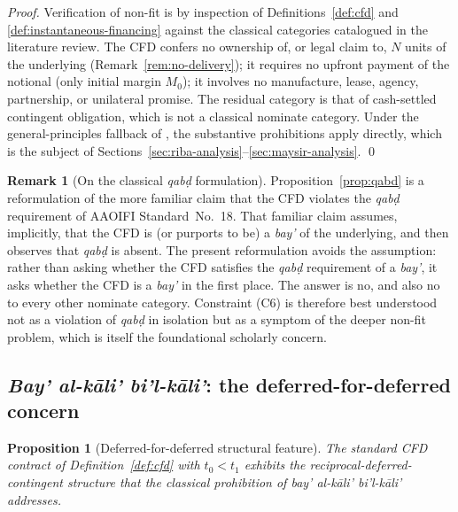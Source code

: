 \documentclass[preprint,12pt,authoryear]{elsarticle}
\newtheorem{proposition}{Proposition}[section]
\theoremstyle{definition}
\newtheorem{remark}{Remark}[section]
\begin{document}
\begin{proof}
Verification of non-fit is by inspection of
Definitions~\ref{def:cfd} and \ref{def:instantaneous-financing}
against the classical categories catalogued in the literature
review. The CFD confers no ownership of, or legal claim to, $N$
units of the underlying (Remark~\ref{rem:no-delivery}); it
requires no upfront payment of the notional (only initial margin
$M_0$); it involves no manufacture, lease, agency, partnership, or
unilateral promise. The residual category is that of
cash-settled contingent obligation, which is not a classical
nominate category. Under the general-principles fallback of
\citet{Kamali2000}, the substantive prohibitions apply directly,
which is the subject of Sections~\ref{sec:riba-analysis}--\ref{sec:maysir-analysis}.
\qed
\end{proof}

\begin{remark}[On the classical \emph{qab\d{d}} formulation]
\label{rem:qabd-classical}
Proposition~\ref{prop:qabd} is a reformulation of the more
familiar claim that the CFD violates the \emph{qab\d{d}}
requirement of AAOIFI Standard~No.~18. That familiar claim
assumes, implicitly, that the CFD is (or purports to be) a
\emph{bay'} of the underlying, and then observes that
\emph{qab\d{d}} is absent. The present reformulation avoids the
assumption: rather than asking whether the CFD satisfies the
\emph{qab\d{d}} requirement of a \emph{bay'}, it asks whether the
CFD is a \emph{bay'} in the first place. The answer is no, and
also no to every other nominate category. Constraint (C6) is
therefore best understood not as a violation of \emph{qab\d{d}}
in isolation but as a symptom of the deeper non-fit problem,
which is itself the foundational scholarly concern.
\end{remark}

\subsection{\emph{Bay' al-k\={a}li' bi'l-k\={a}li'}: the
    deferred-for-deferred concern}
\label{sec:kali-analysis}

\begin{proposition}[Deferred-for-deferred structural feature]
\label{prop:bay-kali}
The standard CFD contract of Definition~\ref{def:cfd} with
$t_0 < t_1$ exhibits the reciprocal-deferred-contingent structure
that the classical prohibition of
\emph{bay' al-k\={a}li' bi'l-k\={a}li'} addresses.
\end{proposition}
\end{document}
